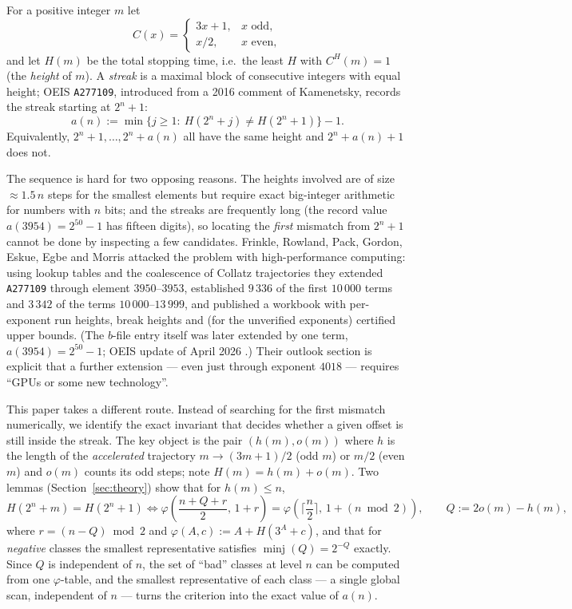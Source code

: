 \documentclass[11pt]{article}
\theoremstyle{remark}
\newcommand{\Cl}{C}
\newcommand{\ooo}{o}
\newcommand{\hh}{h}
\begin{document}
For a positive integer $m$ let
\[
\Cl(x)=\begin{cases}3x+1,&x\text{ odd},\\ x/2,&x\text{ even},\end{cases}
\]
and let $H(m)$ be the total stopping time, i.e.\ the least $H$ with $\Cl^{H}(m)=1$ (the \emph{height} of $m$).
A \emph{streak} is a maximal block of consecutive integers with equal height; OEIS \texttt{A277109},
introduced from a 2016 comment of Kamenetsky, records the streak starting at $2^n+1$:
\begin{equation}\label{eq:def}
a(n):=\min\{j\ge 1:\ H(2^n+j)\ne H(2^n+1)\}-1 .
\end{equation}
Equivalently, $2^n+1,\dots,2^n+a(n)$ all have the same height and $2^n+a(n)+1$ does not.

The sequence is hard for two opposing reasons. The heights involved are of size $\approx 1.5\,n$ steps
for the smallest elements but require exact big-integer arithmetic for numbers with $n$ bits; and the
streaks are frequently long (the record value $a(3954)=2^{50}-1$ has fifteen digits), so locating the
\emph{first} mismatch from $2^n+1$ cannot be done by inspecting a few candidates.
Frinkle, Rowland, Pack, Gordon, Eskue, Egbe and Morris \cite{frinkle2025} attacked the problem with
high-performance computing: using lookup tables and the coalescence of Collatz trajectories they
extended \texttt{A277109} through element $3950$--$3953$, established $9\,336$ of the first $10\,000$
terms and $3\,342$ of the terms $10\,000$--$13\,999$, and published a workbook with per-exponent
run heights, break heights and (for the unverified exponents) certified upper bounds. (The $b$-file entry
itself was later extended by one term, $a(3954)=2^{50}-1$; OEIS update of April 2026 \cite{oeisA277109}.)
Their outlook section is explicit that a further extension --- even just through exponent $4018$ ---
requires ``GPUs or some new technology''.

This paper takes a different route. Instead of searching for the first mismatch numerically, we
identify the exact invariant that decides whether a given offset is still inside the streak.
The key object is the pair $(\hh(m),\ooo(m))$ where $\hh$ is the length of the
\emph{accelerated} trajectory $m\to(3m+1)/2$ (odd $m$) or $m/2$ (even $m$) and $\ooo(m)$ counts its odd
steps; note $H(m)=\hh(m)+\ooo(m)$.
Two lemmas (Section~\ref{sec:theory}) show that for $\hh(m)\le n$,
\begin{equation}\label{eq:criterion}
H(2^n+m)=H(2^n+1)
\iff
\varphi\!\left(\frac{n+Q+r}{2},\,1+r\right)=\varphi\!\left(\Big\lceil\frac n2\Big\rceil,\,1+(n\bmod 2)\right),
\qquad Q:=2\ooo(m)-\hh(m),
\end{equation}
where $r=(n-Q)\bmod 2$ and $\varphi(A,c):=A+H(3^A+c)$, and that for \emph{negative} classes the
smallest representative satisfies $\operatorname{minj}(Q)=2^{-Q}$ exactly.
Since $Q$ is independent of $n$, the set of ``bad'' classes at level $n$ can be computed from one
$\varphi$-table, and the smallest representative of each class --- a single global scan, independent of
$n$ --- turns the criterion into the exact value of $a(n)$.
\end{document}

